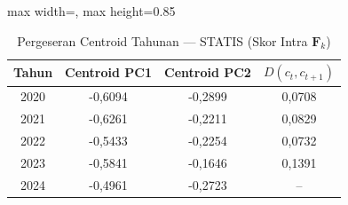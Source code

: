 \begin{table}[H]
\centering
\caption{Pergeseran Centroid Tahunan --- STATIS (Skor Intra $\mathbf{F}_k$)} \label{tab:app2centroid_statis}
\begin{adjustbox}{max width=\textwidth, max height=0.85\textheight}
\begin{tabular}{|c|c|c|c|}
\hline
\textbf{Tahun} & \textbf{Centroid PC1} & \textbf{Centroid PC2} & \textbf{$D(c_t, c_{t+1})$} \\
\hline
2020 & -0,6094 & -0,2899 & 0,0708 \\
2021 & -0,6261 & -0,2211 & 0,0829 \\
2022 & -0,5433 & -0,2254 & 0,0732 \\
2023 & -0,5841 & -0,1646 & 0,1391 \\
2024 & -0,4961 & -0,2723 & -- \\
\hline
\end{tabular}
\end{adjustbox}
\end{table}